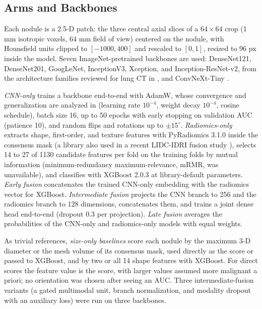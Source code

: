 \documentclass[conference]{IEEEtran}
\begin{document}
\subsection{Arms and Backbones}\label{sec:arms}
Each nodule is a 2.5-D patch: the three central axial slices of a $64\times64$ crop (1 mm isotropic voxels, 64 mm field of view) centered on the nodule, with Hounsfield units clipped to $[-1000,400]$ and rescaled to $[0,1]$, resized to 96 px inside the model. Seven ImageNet-pretrained backbones are used: DenseNet121, DenseNet201, GoogLeNet, InceptionV3, Xception, and Inception-ResNet-v2, from the architecture families reviewed for lung CT in \cite{abdullahi_review_2025}, and ConvNeXt-Tiny \cite{liu_convnext_2022}.

\emph{CNN-only} trains a backbone end-to-end with AdamW, whose convergence and generalization are analyzed in \cite{zhou_adamw_2024} (learning rate $10^{-4}$, weight decay $10^{-4}$, cosine schedule), batch size 16, up to 50 epochs with early stopping on validation AUC (patience 10), and random flips and rotations up to $\pm15^\circ$. \emph{Radiomics-only} extracts shape, first-order, and texture features with PyRadiomics 3.1.0 inside the consensus mask (a library also used in a recent LIDC-IDRI fusion study \cite{zheng_multilevel_2026}), selects 14 to 27 of 1130 candidate features per fold on the training folds by mutual information (minimum-redundancy maximum-relevance, mRMR, was unavailable), and classifies with XGBoost 2.0.3 at library-default parameters. \emph{Early fusion} concatenates the trained CNN-only embedding with the radiomics vector for XGBoost. \emph{Intermediate fusion} projects the CNN branch to 256 and the radiomics branch to 128 dimensions, concatenates them, and trains a joint dense head end-to-end (dropout 0.3 per projection). \emph{Late fusion} averages the probabilities of the CNN-only and radiomics-only models with equal weights.

As trivial references, \emph{size-only baselines} score each nodule by the maximum 3-D diameter or the mesh volume of its consensus mask, used directly as the score or passed to XGBoost, and by two or all 14 shape features with XGBoost. For direct scores the feature value is the score, with larger values assumed more malignant a priori; no orientation was chosen after seeing an AUC. Three intermediate-fusion variants (a gated multimodal unit, branch normalization, and modality dropout with an auxiliary loss) were run on three backbones.
\end{document}
